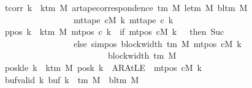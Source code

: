 \begin{isabellebody}
\ \ \ \ \ \ \ tcorr{\isacharcolon}{\kern0pt}\ {\isachardoublequoteopen}{\isasymforall}k\ {\isacharless}{\kern0pt}\ k{\isacharunderscore}{\kern0pt}tm\ M{\isachardot}{\kern0pt}\ ar{\isacharunderscore}{\kern0pt}tape{\isacharunderscore}{\kern0pt}correspondence\ {\isacharparenleft}{\kern0pt}{\isasymGamma}{\isacharunderscore}{\kern0pt}tm\ M{\isacharparenright}{\kern0pt}\ {\isacharparenleft}{\kern0pt}le{\isacharunderscore}{\kern0pt}tm\ M{\isacharparenright}{\kern0pt}\ {\isacharparenleft}{\kern0pt}bl{\isacharunderscore}{\kern0pt}tm\ M{\isacharparenright}{\kern0pt}\isanewline
\ \ \ \ \ \ \ \ \ \ \ \ \ \ \ \ \ \ \ \ \ \ \ {\isacharparenleft}{\kern0pt}mt{\isacharunderscore}{\kern0pt}tape\ cM\ k{\isacharparenright}{\kern0pt}\ {\isacharparenleft}{\kern0pt}mt{\isacharunderscore}{\kern0pt}tape\ c{}\ k{\isacharparenright}{\kern0pt}{\isachardoublequoteclose}\isanewline
\ \ \ \ \ \ \ ppos{\isacharcolon}{\kern0pt}\ {\isachardoublequoteopen}{\isasymforall}k\ {\isacharless}{\kern0pt}\ k{\isacharunderscore}{\kern0pt}tm\ M{\isachardot}{\kern0pt}\ mt{\isacharunderscore}{\kern0pt}pos\ c{}\ k\ {\isacharequal}{\kern0pt}\ {\isacharparenleft}{\kern0pt}if\ mt{\isacharunderscore}{\kern0pt}pos\ cM\ k\ {\isacharequal}{\kern0pt}\ {}\ then\ Suc\ {}\isanewline
\ \ \ \ \ \ \ \ \ \ \ \ \ \ \ \ \ \ \ \ \ \ \ else\ sim{\isacharunderscore}{\kern0pt}pos\ {\isacharparenleft}{\kern0pt}block{\isacharunderscore}{\kern0pt}width\ {\isacharparenleft}{\kern0pt}{\isasymGamma}{\isacharunderscore}{\kern0pt}tm\ M{\isacharparenright}{\kern0pt}{\isacharparenright}{\kern0pt}\ {\isacharparenleft}{\kern0pt}mt{\isacharunderscore}{\kern0pt}pos\ cM\ k{\isacharparenright}{\kern0pt}\isanewline
\ \ \ \ \ \ \ \ \ \ \ \ \ \ \ \ \ \ \ \ \ \ \ \ \ \ \ \ \ \ {\isacharplus}{\kern0pt}\ block{\isacharunderscore}{\kern0pt}width\ {\isacharparenleft}{\kern0pt}{\isasymGamma}{\isacharunderscore}{\kern0pt}tm\ M{\isacharparenright}{\kern0pt}{\isacharparenright}{\kern0pt}{\isachardoublequoteclose}\isanewline
\ \ \ \ \ \ \ poskle{\isacharcolon}{\kern0pt}\ {\isachardoublequoteopen}{\isasymforall}k\ {\isacharless}{\kern0pt}\ k{\isacharunderscore}{\kern0pt}tm\ M{\isachardot}{\kern0pt}\ posk\ k\ {\isacharequal}{\kern0pt}\ AR{\isacharunderscore}{\kern0pt}AtLE\ {\isasymlongleftrightarrow}\ mt{\isacharunderscore}{\kern0pt}pos\ cM\ k\ {\isacharequal}{\kern0pt}\ {}{\isachardoublequoteclose}\isanewline
\ \ \ \ \ \ \ buf{\isacharunderscore}{\kern0pt}valid{\isacharcolon}{\kern0pt}\ {\isachardoublequoteopen}{\isasymforall}k{\isachardot}{\kern0pt}\ buf\ k\ {\isasymin}\ {\isasymGamma}{\isacharunderscore}{\kern0pt}tm\ M\ {\isasymunion}\ {\isacharbraceleft}{\kern0pt}bl{\isacharunderscore}{\kern0pt}tm\ M{\isacharbraceright}{\kern0pt}{\isachardoublequoteclose}\isanewline

\end{isabellebody}
